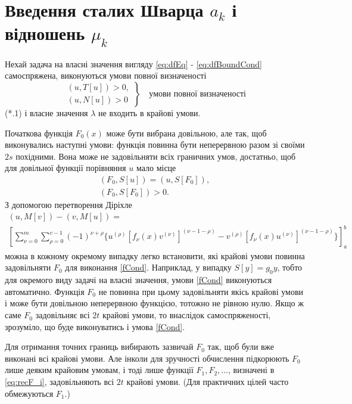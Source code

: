 \documentclass[12pt,a4paper]{article}
\begin{document}
\section{Введення сталих Шварца $a_k$ і відношень $\mu_k$}

Нехай задача на власні значення вигляду \eqref{eq:dfEq} - \eqref{eq:dfBoundCond} самоспряжена, виконуються умови повної визначеності
\begin{equation*}
\left. \begin{array}{l}
	(u, T[u]) > 0,\\
	(u, N[u]) > 0
\end{array} \right\}
\quad \text{умови повної визначеності}
\tag{*.1}
\end{equation*}
 (*.1) і власне значення $\lambda$ не входить в крайові умови.

Початкова функція $F_0(x)$ може бути вибрана довільною, але так, щоб виконувались наступні умови: функція повинна бути неперервною разом зі своїми $2s$ похідними. Вона може не задовільняти всіх граничних умов, достатньо, щоб для довільної функції порівняння $u$ мало місце
\begin{equation}\label{fCond}
\begin{array}{l}
	(F_0, S[u]) = (u, S[F_0]),\\
	(F_0, S[F_0]) > 0.
\end{array}
\end{equation}
З допомогою перетворення Діріхле 
\begin{equation*}
\begin{array}{l}
	(u,M[v])-(v,M[u]) =\\
	\left[
	\sum_{\nu=0}^m \sum_{\rho=0}^{v-1}
		(-1)^{\nu+\rho}
		\{
		 u^{(\rho)}[f_{\nu}(x)v^{(\nu)}]^{(\nu-1-\rho)}
		-v^{(\rho)}[f_{\nu}(x)u^{(\nu)}]^{(\nu-1-\rho)}
		\}
	\right]_a^b
\end{array}
\tag{*.2}
\end{equation*}
можна в кожному окремому випадку легко встановити, які крайові умови повинна задовільняти $F_0$ для виконання \eqref{fCond}. Наприклад, у випадку $S[y]=g_0 y$, тобто для окремого виду задачі на власні значення, умови \eqref{fCond} виконуються автоматично. Функція $F_0$ не повинна при цьому задовільняти якісь крайові умови і може бути довільною неперервною функцією, тотожно не рівною нулю. Якщо ж саме $F_0$ задовільняє всі $2t$ крайові умови, то внаслідок самоспряженості, зрозуміло, що буде виконуватись і умова \eqref{fCond}.

Для отримання точних границь вибирають зазвичай $F_0$ так, щоб були вже виконані всі крайові умови. Але інколи для зручності обчислення підкорюють $F_0$ лише деяким крайовим умовам, і тоді лише функції $F_1, F_2, \dots$, визначені в \eqref{eq:recF_i}, задовільняють всі $2t$ крайові умови. (Для практичних цілей часто обмежуються $F_1$.)
\end{document}
